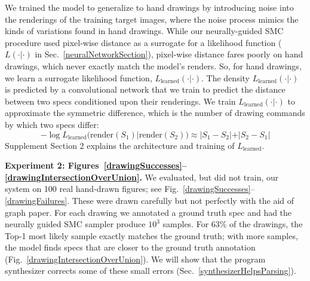 \documentclass{article}
\theoremstyle{definition}
\begin{document}
 We trained the model
to generalize to hand drawings by introducing noise into the
renderings of the training target images, where the noise process  mimics the kinds of variations found in hand drawings.
While our neurally-guided SMC procedure
used pixel-wise distance as a surrogate for a likelihood function ($L(\cdot|\cdot)$ in Sec.~\ref{neuralNetworkSection}),
 pixel-wise distance fares poorly on hand drawings, which never exactly match
the model's renders.
So, for hand drawings,
we learn a surrogate likelihood function,
$L_{\text{learned}}(\cdot|\cdot)$.
The density $L_{\text{learned}}(\cdot|\cdot)$ is predicted by a convolutional network that we train to predict
the distance between two specs conditioned upon their renderings.
We train $L_{\text{learned}}(\cdot |\cdot )$  to approximate the symmetric difference,
which is  the number of drawing commands by which two specs  differ:
  \begin{equation}
    -\log L_{\text{learned}}(\text{render}(S_1)|\text{render}(S_2))\approx |S_1 - S_2| + |S_2 - S_1|\label{symmetricDistance}
  \end{equation}
Supplement Section 2 explains the architecture and training of $L_{\text{learned}}$.




  \textbf{Experiment 2: Figures~\ref{drawingSuccesses}--\ref{drawingIntersectionOverUnion}.}
    We evaluated, but did not train, our system on 100 real hand-drawn figures; see Fig.~\ref{drawingSuccesses}--\ref{drawingFailures}.
These were drawn carefully but not perfectly with the aid of graph paper.
For each drawing we annotated a ground truth spec and had the neurally guided SMC sampler
produce $10^3$ samples. %
For 63\% of the drawings, the Top-1 most likely sample exactly matches the
ground truth; with more samples, the model finds specs
that are closer to the ground truth annotation (Fig.~\ref{drawingIntersectionOverUnion}).
We will show that the program synthesizer
corrects some of these small errors (Sec.~\ref{synthesizerHelpsParsing}).
\end{document}
